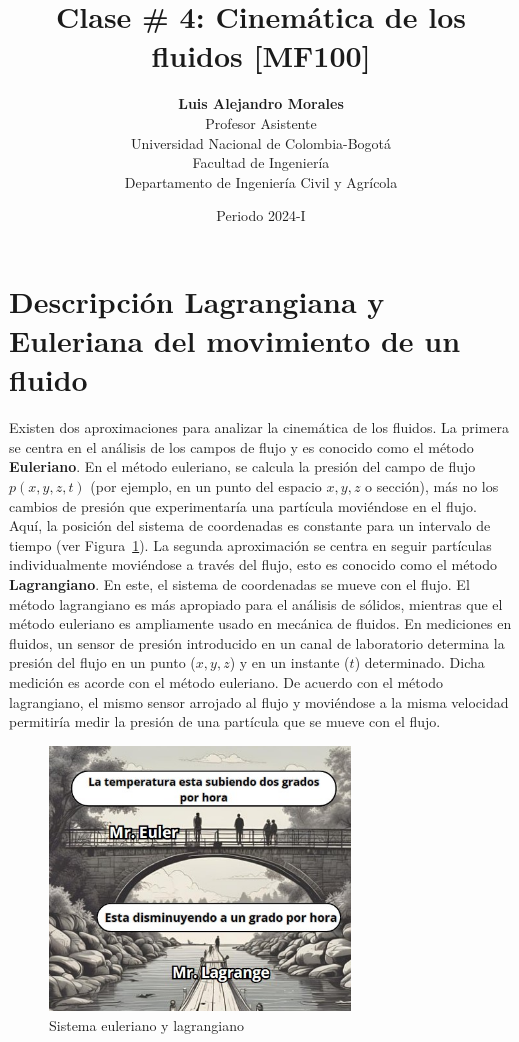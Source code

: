 \documentclass[10pt, oneside]{article}
\title{Clase \# 4: Cinem\'atica de los fluidos [MF100]}
\author{\textbf{Luis Alejandro Morales}\\ \vspace{0.4cm} Profesor Asistente \\ Universidad Nacional de Colombia-Bogot\'a\\Facultad de Ingenier\'ia \\ Departamento de Ingeniería Civil y Agr\'icola}
\date{Periodo 2024-I}
\begin{document}
\maketitle
\tableofcontents

\vspace{.25in}

\section{Descripci\'on Lagrangiana y Euleriana del movimiento de un fluido}

Existen dos aproximaciones para analizar la cinemática de los fluidos. La primera se centra en el análisis de los campos de flujo y es conocido como el método \textbf{Euleriano}. En el método euleriano, se calcula la presión del campo de flujo $p(x,y,z,t)$ (por ejemplo, en un punto del espacio $x,y,z$ o sección), más no los cambios de presión que experimentaría una partícula moviéndose en el flujo. Aquí, la posición del sistema de coordenadas es constante para un intervalo de tiempo (ver Figura~\ref{eulan}). La segunda aproximación se centra en seguir partículas individualmente moviéndose a través del flujo, esto es conocido como el método \textbf{Lagrangiano}. En este, el sistema de coordenadas se mueve con el flujo. El método lagrangiano es más apropiado para el análisis de sólidos, mientras que el método euleriano es ampliamente usado en mecánica de fluidos. En mediciones en fluidos, un sensor de presión introducido en un canal de laboratorio determina la presión del flujo en un punto ($x,y,z$) y en un instante ($t$) determinado. Dicha medición es acorde con el método euleriano. De acuerdo con el método lagrangiano, el mismo sensor arrojado al flujo y moviéndose a la misma velocidad permitiría medir la presión de una partícula que se mueve con el flujo.

\begin{figure}[h]
\centering
\includegraphics[width=8cm]{Fig.1.jpg}
\caption{Sistema euleriano y lagrangiano}
\label{eulan}
\end{figure}
\end{document}
